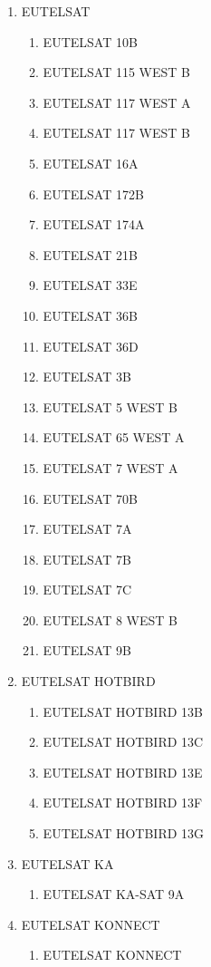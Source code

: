 \begin{multicols}{2}
\begin{enumerate}
\begin{enumerate}
  \end{enumerate}
  \item EUTELSAT
  \begin{enumerate}
    \item EUTELSAT 10B
    \item EUTELSAT 115 WEST B
    \item EUTELSAT 117 WEST A
    \item EUTELSAT 117 WEST B
    \item EUTELSAT 16A
    \item EUTELSAT 172B
    \item EUTELSAT 174A
    \item EUTELSAT 21B
    \item EUTELSAT 33E
    \item EUTELSAT 36B
    \item EUTELSAT 36D
    \item EUTELSAT 3B
    \item EUTELSAT 5 WEST B
    \item EUTELSAT 65 WEST A
    \item EUTELSAT 7 WEST A
    \item EUTELSAT 70B
    \item EUTELSAT 7A
    \item EUTELSAT 7B
    \item EUTELSAT 7C
    \item EUTELSAT 8 WEST B
    \item EUTELSAT 9B
  \end{enumerate}
  \item EUTELSAT HOTBIRD
  \begin{enumerate}
    \item EUTELSAT HOTBIRD 13B
    \item EUTELSAT HOTBIRD 13C
    \item EUTELSAT HOTBIRD 13E
    \item EUTELSAT HOTBIRD 13F
    \item EUTELSAT HOTBIRD 13G
  \end{enumerate}
  \item EUTELSAT KA
  \begin{enumerate}
    \item EUTELSAT KA-SAT 9A
  \end{enumerate}
  \item EUTELSAT KONNECT
  \begin{enumerate}
    \item EUTELSAT KONNECT
  \end{enumerate}

\end{enumerate}
\end{multicols}
